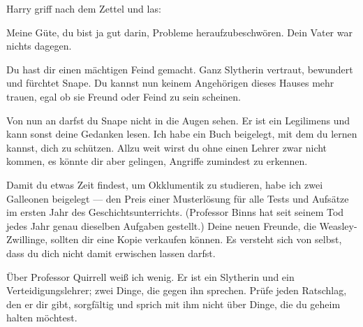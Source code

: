 Harry griff nach dem Zettel und las:

\begin{writtenNote}
Meine Güte, du bist ja gut darin, Probleme heraufzubeschwören. Dein Vater war nichts dagegen.

Du hast dir einen mächtigen Feind gemacht. Ganz Slytherin vertraut, bewundert und fürchtet Snape. Du kannst nun keinem Angehörigen dieses Hauses mehr trauen, egal ob sie Freund oder Feind zu sein scheinen.

Von nun an darfst du Snape nicht in die Augen sehen. Er ist ein Legilimens und kann sonst deine Gedanken lesen. Ich habe ein Buch beigelegt, mit dem du lernen kannst, dich zu schützen. Allzu weit wirst du ohne einen Lehrer zwar nicht kommen, es könnte dir aber gelingen, Angriffe zumindest zu erkennen.

Damit du etwas Zeit findest, um Okklumentik zu studieren, habe ich zwei Galleonen beigelegt — den Preis einer Musterlösung für alle Tests und Aufsätze im ersten Jahr des Geschichtsunterrichts. (Professor Binns hat seit seinem Tod jedes Jahr genau dieselben Aufgaben gestellt.) Deine neuen Freunde, die Weasley-Zwillinge, sollten dir eine Kopie verkaufen können. Es versteht sich von selbst, dass du dich nicht damit erwischen lassen darfst.

Über Professor Quirrell weiß ich wenig. Er ist ein Slytherin und ein Verteidigungslehrer; zwei Dinge, die gegen ihn sprechen. Prüfe jeden Ratschlag, den er dir gibt, sorgfältig und sprich mit ihm nicht über Dinge, die du geheim halten möchtest.


\end{writtenNote}
